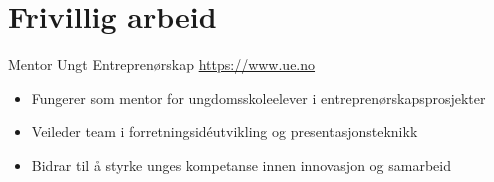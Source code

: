 \documentclass[a4paper, serif, 10pt]{moderncv}
\begin{document}
\section{Frivillig arbeid}

        {Mentor}
        {Ungt Entreprenørskap}
        {\url{https://www.ue.no}}
        {}
        {\begin{itemize}
\item Fungerer som mentor for ungdomsskoleelever i entreprenørskapsprosjekter
\item Veileder team i forretningsidéutvikling og presentasjonsteknikk
\item Bidrar til å styrke unges kompetanse innen innovasjon og samarbeid
\end{itemize}}
    
\end{document}
